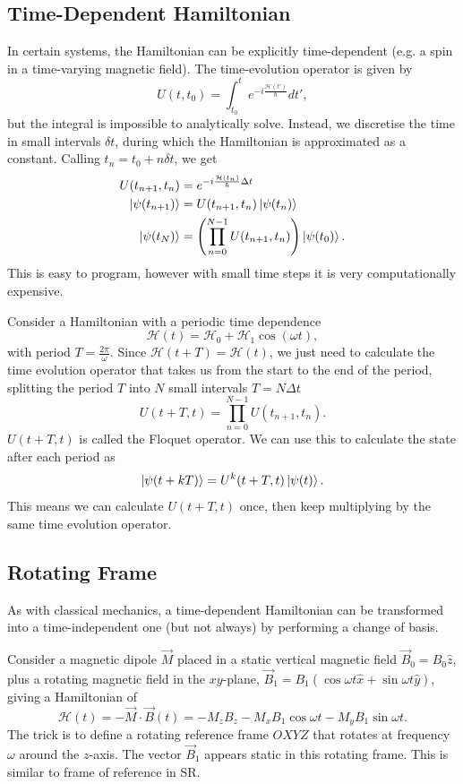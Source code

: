 \documentclass{article}
\begin{document}
\subsection{Time-Dependent Hamiltonian}
In certain systems, the Hamiltonian can be explicitly time-dependent (e.g. a spin in a time-varying magnetic field). The time-evolution operator is given by
\[
    U(t,t_0)=\int_{t_0}^t e^{-i \frac{\mathcal{H}(t')}{\hbar}}dt',
\]
but the integral is impossible to analytically solve. Instead, we discretise the time in small intervals $\delta t$, during which the Hamiltonian is approximated as a constant. Calling $t_n=t_0+n\delta t$, we get
\begin{align*}
    U(t_{n+1},t_n) &= e^{-i \frac{\mathcal{H}(t_n)}{\hbar}\Delta t} \\
    \ket{\psi (t_{n+1})}&= U(t_{n+1},t_n)\ket{\psi (t_n)}\\
    \ket{\psi (t_N)} &= \left( \prod_{n=0}^{N-1} U(t_{n+1},t_n) \right)\ket{\psi (t_0)}.
\end{align*}
This is easy to program, however with small time steps it is very computationally expensive.

Consider a Hamiltonian with a periodic time dependence
\[
    \mathcal{H}(t)=\mathcal{H}_0+\mathcal{H}_1\cos(\omega t),
\]
with period $T=\frac{2\pi }{\omega }$. Since $\mathcal{H}(t+T)=\mathcal{H}(t)$, we just need to calculate the time evolution operator that takes us from the start to the end of the period, splitting the period $T$ into $N$ small intervals $T=N\Delta t$
\[
    U(t+T,t) = \prod_{n=0}^{N-1} U(t_{n+1},t_n).
\]
$U(t+T,t)$ is called the Floquet operator. We can use this to calculate the state after each period as
\[
    \ket{\psi (t+k T)}=U^k(t+T,t)\ket{\psi (t)}.
\]
This means we can calculate $U(t+T,t)$ once, then keep multiplying by the same time evolution operator.

\subsection{Rotating Frame}
As with classical mechanics, a time-dependent Hamiltonian can be transformed into a time-independent one (but not always) by performing a change of basis.

Consider a magnetic dipole $\vec{M}$ placed in a static vertical magnetic field $\vec{B}_0=B_0\hat{z}$, plus a rotating magnetic field in the $xy$-plane, $\vec{B}_1=B_1(\cos\omega t \hat{x}+\sin\omega t\hat{y})$, giving a Hamiltonian of
\[
    \mathcal{H}(t)=-\vec{M}\cdot\vec{B}(t)=-M_zB_z-M_xB_1\cos\omega t-M_yB_1\sin\omega t.
\]
The trick is to define a rotating reference frame $OXYZ$ that rotates at frequency $\omega $ around the $z$-axis. The vector $\vec{B}_1$ appears static in this rotating frame. This is similar to frame of reference in SR.
\end{document}
